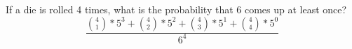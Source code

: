 \item If a die is rolled 4 times, what is the probability that 6 comes up at least once?
\[\frac{\binom{4}{1} * 5^3 + \binom{4}{2} * 5^2 + \binom{4}{3} * 5^1 + \binom{4}{4} * 5^0}{6^4} \]